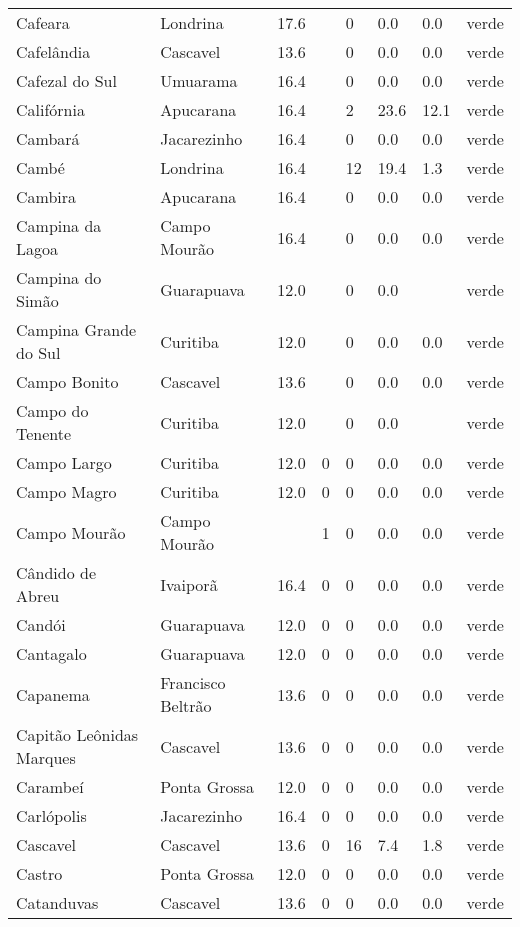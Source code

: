 \begin{longtable}{l|lllllll}
  Cafeara & Londrina & 17.6 &  & 0 & 0.0 & 0.0 & verde \\ 
  Cafelândia & Cascavel & 13.6 &  & 0 & 0.0 & 0.0 & verde \\ 
  Cafezal do Sul & Umuarama & 16.4 &  & 0 & 0.0 & 0.0 & verde \\ 
  Califórnia & Apucarana & 16.4 &  & 2 & 23.6 & 12.1 & verde \\ 
  Cambará & Jacarezinho & 16.4 &  & 0 & 0.0 & 0.0 & verde \\ 
  Cambé & Londrina & 16.4 &  & 12 & 19.4 & 1.3 & verde \\ 
  Cambira & Apucarana & 16.4 &  & 0 & 0.0 & 0.0 & verde \\ 
  Campina da Lagoa & Campo Mourão & 16.4 &  & 0 & 0.0 & 0.0 & verde \\ 
  Campina do Simão & Guarapuava & 12.0 &  & 0 & 0.0 &  & verde \\ 
  Campina Grande do Sul & Curitiba & 12.0 &  & 0 & 0.0 & 0.0 & verde \\ 
  Campo Bonito & Cascavel & 13.6 &  & 0 & 0.0 & 0.0 & verde \\ 
  Campo do Tenente & Curitiba & 12.0 &  & 0 & 0.0 &  & verde \\ 
  Campo Largo & Curitiba & 12.0 & 0 & 0 & 0.0 & 0.0 & verde \\ 
  Campo Magro & Curitiba & 12.0 & 0 & 0 & 0.0 & 0.0 & verde \\ 
  Campo Mourão & Campo Mourão &  & 1 & 0 & 0.0 & 0.0 & verde \\ 
  Cândido de Abreu & Ivaiporã & 16.4 & 0 & 0 & 0.0 & 0.0 & verde \\ 
  Candói & Guarapuava & 12.0 & 0 & 0 & 0.0 & 0.0 & verde \\ 
  Cantagalo & Guarapuava & 12.0 & 0 & 0 & 0.0 & 0.0 & verde \\ 
  Capanema & Francisco Beltrão & 13.6 & 0 & 0 & 0.0 & 0.0 & verde \\ 
  Capitão Leônidas Marques & Cascavel & 13.6 & 0 & 0 & 0.0 & 0.0 & verde \\ 
  Carambeí & Ponta Grossa & 12.0 & 0 & 0 & 0.0 & 0.0 & verde \\ 
  Carlópolis & Jacarezinho & 16.4 & 0 & 0 & 0.0 & 0.0 & verde \\ 
  Cascavel & Cascavel & 13.6 & 0 & 16 & 7.4 & 1.8 & verde \\ 
  Castro & Ponta Grossa & 12.0 & 0 & 0 & 0.0 & 0.0 & verde \\ 
  Catanduvas & Cascavel & 13.6 & 0 & 0 & 0.0 & 0.0 & verde \\ 

\end{longtable}
